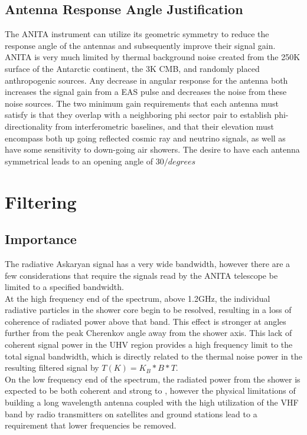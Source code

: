 	\subsection{Antenna Response Angle Justification}
		The ANITA instrument can utilize its geometric symmetry to reduce the response angle of the antennas and subsequently improve their signal gain.  ANITA is very much limited by thermal background noise created from the 250K surface of the Antarctic continent, the 3K CMB, and randomly placed anthropogenic sources.  Any decrease in angular response for the antenna both increases the signal gain from a EAS pulse and decreases the noise from these noise sources.  The two minimum gain requirements that each antenna must satisfy is that they overlap with a neighboring phi sector pair to establish phi-directionality from interferometric baselines, and that their elevation must encompass both up going reflected cosmic ray and neutrino signals, as well as have some sensitivity to down-going air showers.  The desire to have each antenna symmetrical leads to an opening angle of 30$/degrees$
	
\section{Filtering}
	\subsection{Importance}
		The radiative Askaryan signal has a very wide bandwidth, however there are a few considerations that require the signals read by the ANITA telescope be limited to a specified bandwidth.  \\
		At the high frequency end of the spectrum, above 1.2GHz, the individual radiative particles in the shower core begin to be resolved, resulting in a loss of coherence of radiated power above that band.  This effect is stronger at angles further from the peak Cherenkov angle away from the shower axis.  This lack of coherent signal power in the UHV region provides a high frequency limit to the total signal bandwidth, which is directly related to the thermal noise power in the resulting filtered signal by $T(K) = K_{B}*B*T.$ \\
		On the low frequency end of the spectrum, the radiated power from the shower is expected to be both coherent and strong to , however the physical limitations of building a long wavelength antenna coupled with the high utilization of the VHF band by radio transmitters on satellites and ground stations lead to a requirement that lower frequencies be removed. \\
